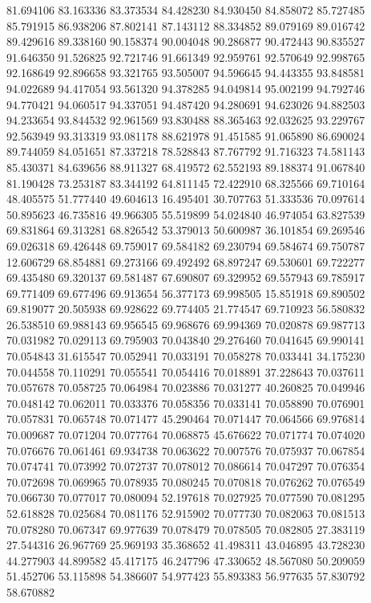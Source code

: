 81.694106
83.163336
83.373534
84.428230
84.930450
84.858072
85.727485
85.791915
86.938206
87.802141
87.143112
88.334852
89.079169
89.016742
89.429616
89.338160
90.158374
90.004048
90.286877
90.472443
90.835527
91.646350
91.526825
92.721746
91.661349
92.959761
92.570649
92.998765
92.168649
92.896658
93.321765
93.505007
94.596645
94.443355
93.848581
94.022689
94.417054
93.561320
94.378285
94.049814
95.002199
94.792746
94.770421
94.060517
94.337051
94.487420
94.280691
94.623026
94.882503
94.233654
93.844532
92.961569
93.830488
88.365463
92.032625
93.229767
92.563949
93.313319
93.081178
88.621978
91.451585
91.065890
86.690024
89.744059
84.051651
87.337218
78.528843
87.767792
91.716323
74.581143
85.430371
84.639656
88.911327
68.419572
62.552193
89.188374
91.067840
81.190428
73.253187
83.344192
64.811145
72.422910
68.325566
69.710164
48.405575
51.777440
49.604613
16.495401
30.707763
51.333536
70.097614
50.895623
46.735816
49.966305
55.519899
54.024840
46.974054
63.827539
69.831864
69.313281
68.826542
53.379013
50.600987
36.101854
69.269546
69.026318
69.426448
69.759017
69.584182
69.230794
69.584674
69.750787
12.606729
68.854881
69.273166
69.492492
68.897247
69.530601
69.722277
69.435480
69.320137
69.581487
67.690807
69.329952
69.557943
69.785917
69.771409
69.677496
69.913654
56.377173
69.998505
15.851918
69.890502
69.819077
20.505938
69.928622
69.774405
21.774547
69.710923
56.580832
26.538510
69.988143
69.956545
69.968676
69.994369
70.020878
69.987713
70.031982
70.029113
69.795903
70.043840
29.276460
70.041645
69.990141
70.054843
31.615547
70.052941
70.033191
70.058278
70.033441
34.175230
70.044558
70.110291
70.055541
70.054416
70.018891
37.228643
70.037611
70.057678
70.058725
70.064984
70.023886
70.031277
40.260825
70.049946
70.048142
70.062011
70.033376
70.058356
70.033141
70.058890
70.076901
70.057831
70.065748
70.071477
45.290464
70.071447
70.064566
69.976814
70.009687
70.071204
70.077764
70.068875
45.676622
70.071774
70.074020
70.076676
70.061461
69.934738
70.063622
70.007576
70.075937
70.067854
70.074741
70.073992
70.072737
70.078012
70.086614
70.047297
70.076354
70.072698
70.069965
70.078935
70.080245
70.070818
70.076262
70.076549
70.066730
70.077017
70.080094
52.197618
70.027925
70.077590
70.081295
52.618828
70.025684
70.081176
52.915902
70.077730
70.082063
70.081513
70.078280
70.067347
69.977639
70.078479
70.078505
70.082805
27.383119
27.544316
26.967769
25.969193
35.368652
41.498311
43.046895
43.728230
44.277903
44.899582
45.417175
46.247796
47.330652
48.567080
50.209059
51.452706
53.115898
54.386607
54.977423
55.893383
56.977635
57.830792
58.670882
